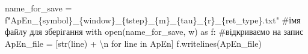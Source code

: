 \documentclass[
  letterpaper,
]{report}
\newenvironment{Shaded}{\begin{snugshade}}{\end{snugshade}}
\newcommand{\BuiltInTok}[1]{\textcolor[rgb]{0.00,0.23,0.31}{#1}}
\newcommand{\CharTok}[1]{\textcolor[rgb]{0.13,0.47,0.30}{#1}}
\newcommand{\CommentTok}[1]{\textcolor[rgb]{0.37,0.37,0.37}{#1}}
\newcommand{\ControlFlowTok}[1]{\textcolor[rgb]{0.00,0.23,0.31}{#1}}
\newcommand{\ImportTok}[1]{\textcolor[rgb]{0.00,0.46,0.62}{#1}}
\newcommand{\KeywordTok}[1]{\textcolor[rgb]{0.00,0.23,0.31}{#1}}
\newcommand{\NormalTok}[1]{\textcolor[rgb]{0.00,0.23,0.31}{#1}}
\newcommand{\OperatorTok}[1]{\textcolor[rgb]{0.37,0.37,0.37}{#1}}
\newcommand{\SpecialCharTok}[1]{\textcolor[rgb]{0.37,0.37,0.37}{#1}}
\newcommand{\SpecialStringTok}[1]{\textcolor[rgb]{0.13,0.47,0.30}{#1}}
\newcommand{\StringTok}[1]{\textcolor[rgb]{0.13,0.47,0.30}{#1}}
\begin{document}
\begin{Shaded}
\begin{Highlighting}[]
\NormalTok{name\_for\_save }\OperatorTok{=} \SpecialStringTok{f"ApEn\_}\SpecialCharTok{\{}\NormalTok{symbol}\SpecialCharTok{\}}\SpecialStringTok{\_}\SpecialCharTok{\{}\NormalTok{window}\SpecialCharTok{\}}\SpecialStringTok{\_}\SpecialCharTok{\{}\NormalTok{tstep}\SpecialCharTok{\}}\SpecialStringTok{\_}\SpecialCharTok{\{}\NormalTok{m}\SpecialCharTok{\}}\SpecialStringTok{\_}\SpecialCharTok{\{}\NormalTok{tau}\SpecialCharTok{\}}\SpecialStringTok{\_}\SpecialCharTok{\{}\NormalTok{r}\SpecialCharTok{\}}\SpecialStringTok{\_}\SpecialCharTok{\{}\NormalTok{ret\_type}\SpecialCharTok{\}}\SpecialStringTok{.txt"} \CommentTok{\#ім\textquotesingle{}я файлу для зберігання}
\ControlFlowTok{with} \BuiltInTok{open}\NormalTok{(name\_for\_save, }\StringTok{\textquotesingle{}w\textquotesingle{}}\NormalTok{) }\ImportTok{as}\NormalTok{ f: }\CommentTok{\#відкриваємо на запис }
\NormalTok{    ApEn\_file }\OperatorTok{=}\NormalTok{ [}\BuiltInTok{str}\NormalTok{(line) }\OperatorTok{+} \StringTok{\textquotesingle{}}\CharTok{\textbackslash{}n}\StringTok{\textquotesingle{}} \ControlFlowTok{for}\NormalTok{ line }\KeywordTok{in}\NormalTok{ ApEn]}
\NormalTok{    f.writelines(ApEn\_file)}
\end{Highlighting}
\end{Shaded}
\end{document}
